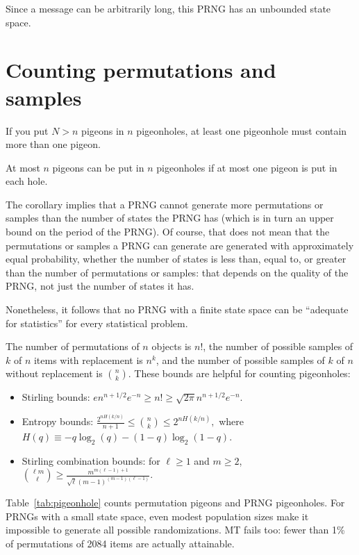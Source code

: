 \documentclass[graybox]{svmult}
\begin{document}
Since a message can be arbitrarily long, this PRNG has an unbounded state space.

\section{Counting permutations and samples}
\label{sec:count}

\begin{theorem}
If you put $N>n$ pigeons in $n$ pigeonholes, at least one
pigeonhole must contain more than one pigeon.
\end{theorem}

\begin{corollary}
At most $n$ pigeons can be put in $n$ pigeonholes if at most
one pigeon is put in each hole.
\end{corollary}

The corollary implies that a PRNG cannot generate more permutations or samples than the number of states the PRNG has (which is in turn an upper bound on the period of the PRNG).
Of course, that does not mean that the permutations or samples a PRNG can generate are generated with approximately equal probability, whether the number of states is less than, equal to, or greater than the number of
permutations or samples: that depends on the quality of the PRNG, not just the number of states it has.

Nonetheless, it follows that no PRNG with a finite state space can be ``adequate for statistics'' for every statistical problem.

The number of permutations of $n$ objects is $n!$, the number of possible samples of $k$ of $n$ items
with replacement is $n^k$,  and the number of possible samples of $k$ of $n$ without replacement is $n \choose k$.
These bounds are helpful for counting pigeonholes:
\begin{itemize}
\item Stirling bounds: $ e n^{n+1/2} e^{-n} \ge n! \ge \sqrt{2 \pi} n^{n+1/2} e^{-n}.$
\item Entropy bounds:
$ \frac{2^{nH(k/n)}}{n+1} \le {n \choose k} \le 2^{nH(k/n)},$ where $H(q) \equiv -q \log_2(q) - (1-q) \log_2 (1-q)$.
\item Stirling combination bounds:
for $\ell \ge 1$ and $m \ge 2$, $ { {\ell m } \choose { \ell }} \ge \frac{m^{m(\ell-1)+1}}{\sqrt{\ell} (m-1)^{(m-1)(\ell-1)}}. $
\end{itemize}

Table~\ref{tab:pigeonhole} counts permutation pigeons and PRNG pigeonholes.
For PRNGs with a small state space, even modest population sizes make it impossible to generate all possible randomizations.
MT fails too: fewer than 1\% of permutations of 2084 items are actually attainable.
\end{document}
